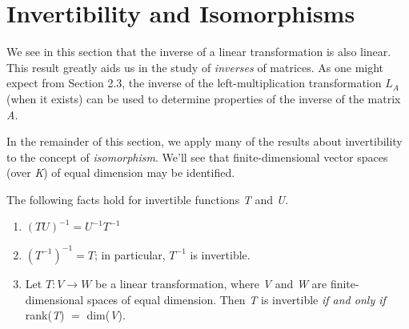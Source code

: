 \section{Invertibility and Isomorphisms}
We see in this section that the inverse of a linear transformation is also linear. This result greatly aids us  in the study of \textit{inverses} of matrices. As one might expect from Section 2.3, the inverse of the left-multiplication transformation $L_A$ (when it exists) can be used to determine properties of the inverse of the matrix \textit{A}.

In the remainder of this section, we apply many of the results about invertibility to the concept of \textit{isomorphism}. We'll see that finite-dimensional vector spaces (over \textit{K}) of equal dimension may be identified.


The following facts hold for invertible functions \textit{T} and \textit{U}.
\begin{enumerate}
  \item $(TU)^{-1} = U^{-1} T^{-1}$
  \item $(T^{-1})^{-1} = T$; in particular, $T^{-1}$ is invertible.
  \item Let $T : V \longrightarrow W$ be a linear transformation, where \textit{V} and \textit{W} are finite-dimensional spaces of equal dimension. Then \textit{T} is invertible \textit{if and only if} rank(\textit{T}) $=$ dim(\textit{V}).
\end{enumerate}





